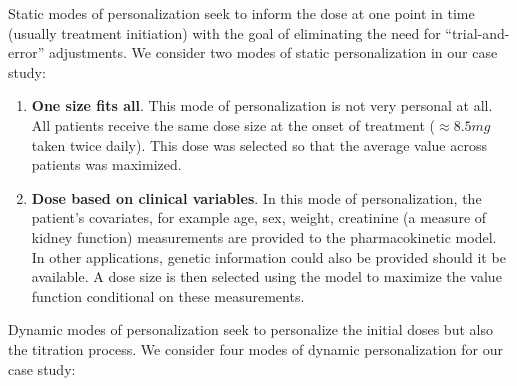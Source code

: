 Static modes of personalization seek to inform the dose at one point in time (usually treatment initiation) with the goal of eliminating the need for ``trial-and-error'' adjustments.  We consider two modes of static personalization in our case study:

\begin{enumerate}
	\item \textbf{One size fits all}.  This mode of personalization is not very personal at all.  All patients receive the same dose size at the onset of treatment ($\approx8.5 mg$ taken twice daily). This dose was selected so that the average value across patients was maximized.  
	\item \textbf{Dose based on clinical variables}.  In this mode of personalization, the patient's covariates, for example age, sex, weight, creatinine (a measure of kidney function) measurements are provided to the pharmacokinetic model.  In other applications, genetic information could also be provided should it be available.  A dose size is then selected using the model to maximize the value function conditional on these measurements.
\end{enumerate}

\noindent Dynamic modes of personalization seek to personalize the initial doses but also the titration process.  We consider four modes of dynamic personalization for our case study:

